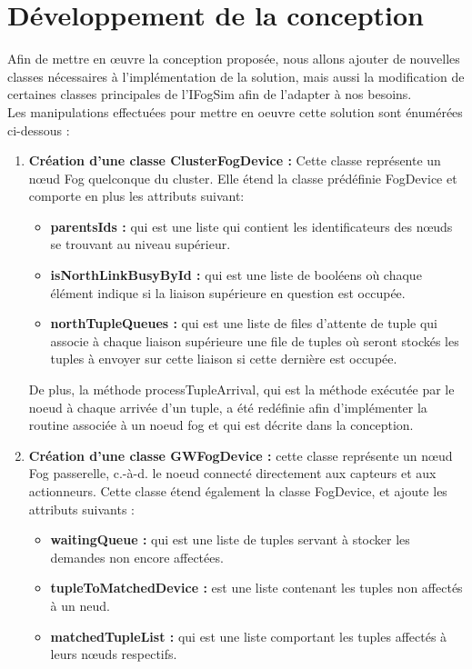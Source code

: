 \section{Développement de la conception}
Afin de mettre en œuvre la conception proposée, nous allons ajouter de nouvelles classes nécessaires à l'implémentation de la solution, mais aussi la modification de certaines classes principales de l'IFogSim afin de l'adapter à nos besoins.\\
Les manipulations effectuées pour mettre en oeuvre cette solution sont énumérées ci-dessous : 
\begin{enumerate}
    \item \textbf{Création d'une classe ClusterFogDevice :} Cette classe représente un nœud Fog quelconque du cluster. Elle étend la classe prédéfinie FogDevice et comporte en plus les attributs suivant:
\begin{itemize}
    \item \textbf{parentsIds :} qui est une liste qui contient les identificateurs des nœuds se trouvant au niveau supérieur.
    \item \textbf{isNorthLinkBusyById :} qui est une liste de booléens où chaque élément indique si la liaison supérieure en question est occupée.
    \item \textbf{northTupleQueues :} qui est une liste de files d'attente de tuple qui associe à chaque liaison supérieure une file de tuples où seront stockés les tuples à envoyer sur cette liaison si cette dernière est occupée.
\end{itemize}
De plus, la méthode  processTupleArrival, qui est la méthode exécutée par le noeud à chaque arrivée d'un tuple, a été redéfinie afin d'implémenter la routine associée à un noeud fog et qui est décrite dans la conception.
     \item \textbf{Création d'une classe GWFogDevice :} cette classe représente un nœud Fog passerelle, c.-à-d. le noeud connecté directement aux capteurs et aux actionneurs. Cette classe étend également la classe FogDevice, et ajoute les attributs suivants :
     \begin{itemize}
     \item \textbf{waitingQueue :} qui est une liste de tuples servant à stocker les demandes non encore affectées.
     \item \textbf{tupleToMatchedDevice :} est une liste contenant les tuples non affectés à un neud.
     \item \textbf{matchedTupleList :} qui est une liste comportant les tuples affectés à leurs nœuds respectifs.

\end{itemize}
\end{enumerate}
